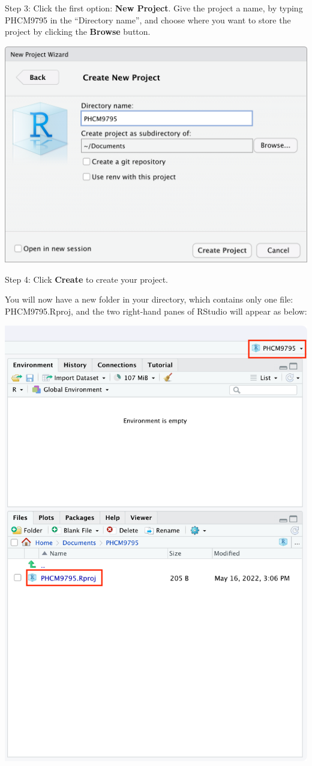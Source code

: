 \documentclass[
]{memoir}
\begin{document}
Step 3: Click the first option: \textbf{New Project}. Give the project a name, by typing PHCM9795 in the ``Directory name'', and choose where you want to store the project by clicking the \textbf{Browse} button.

\includegraphics[width=0.75\linewidth]{img/NewProject-3}

Step 4: Click \textbf{Create} to create your project.

You will now have a new folder in your directory, which contains only one file: PHCM9795.Rproj, and the two right-hand panes of RStudio will appear as below:

\includegraphics[width=0.75\linewidth]{img/NewProject-4}
\end{document}
